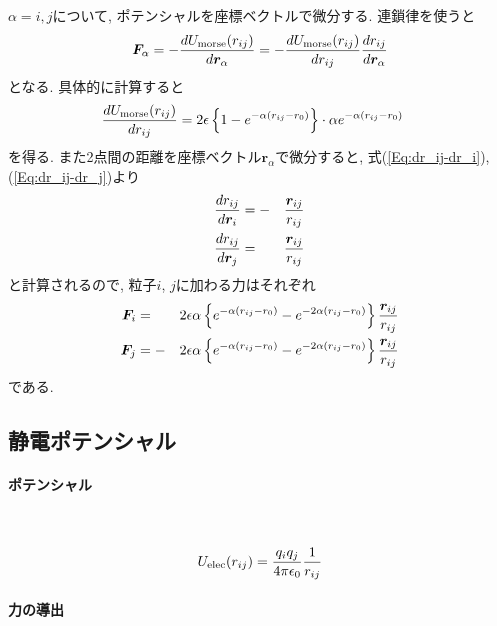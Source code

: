 $\alpha = i, j$について, ポテンシャルを座標ベクトルで微分する. 連鎖律を使うと
\begin{equation}
   \bm{F}_{\alpha}
   =
   -
   \frac{d U_{\mathrm{morse}}(r_{ij})}{d \bm{r}_{\alpha}}
   =
   -
   \frac{d U_{\mathrm{morse}}(r_{ij})}{d r_{ij}}
   \frac{d r_{ij}}{d \bm{r}_{\alpha}}
   \notag
\end{equation}
となる. 具体的に計算すると
\begin{align}
   \frac{d U_{\mathrm{morse}}(r_{ij})}{d r_{ij}}
   &=
   2\epsilon
   \left\{
      1 - e^{-\alpha(r_{ij} - r_{0})}
   \right\}
   \cdot
   \alpha
   e^{-\alpha(r_{ij} - r_{0})}
   \notag
\end{align}
を得る. また2点間の距離を座標ベクトル$\bm{r}_{\alpha}$で微分すると, 式(\ref{Eq:dr_ij-dr_i}), (\ref{Eq:dr_ij-dr_j})より
\begin{alignat}{3}
   \frac{d r_{ij}}{d \bm{r}_{i}}
   &=
   -&&
   \frac{\bm{r}_{ij}}{r_{ij}}
   \notag
   \\
   \frac{d r_{ij}}{d \bm{r}_{j}}
   &=&&
   \frac{\bm{r}_{ij}}{r_{ij}}
   \notag
\end{alignat}
と計算されるので, 粒子$i$, $j$に加わる力はそれぞれ
\begin{alignat}{3}
   \bm{F}_{i}
   &=&&
   2\epsilon \alpha
   \left\{
      e^{-\alpha(r_{ij} - r_{0})}
      -
      e^{-2\alpha(r_{ij} - r_{0})}
   \right\}
   \frac{\bm{r}_{ij}}{r_{ij}}
   \notag \\
   \bm{F}_{j}
   &=
   -&&
   2\epsilon \alpha
   \left\{
      e^{-\alpha(r_{ij} - r_{0})}
      -
      e^{-2\alpha(r_{ij} - r_{0})}
   \right\}
   \frac{\bm{r}_{ij}}{r_{ij}}
   \notag
\end{alignat}
である.


\clearpage
\subsection{静電ポテンシャル}
\paragraph{ポテンシャル} \

\begin{equation}
U_{\mathrm{elec}}(r_{ij}) = \frac{q_{i}q_{j}}{4 \pi \epsilon_{0}}
                            \frac{1}{r_{ij}}
\notag
\end{equation}

\paragraph{力の導出} \

